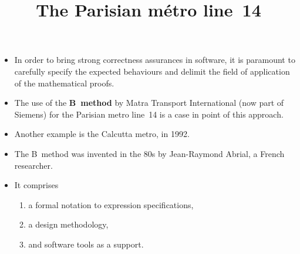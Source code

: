 \documentclass[wide]{slides}
\begin{document}
\begin{slide}
  \title{The Parisian m\'etro line~14}

  \begin{itemize}

    \item In order to bring strong correctness assurances in software,
      it is paramount to carefully specify the expected behaviours and
      delimit the field of application of the mathematical proofs.

    \item The use of the \textbf{B~method} by Matra Transport
      International (now part of Siemens) for the Parisian metro
      line~14 is a case in point of this approach.

    \item Another example is the Calcutta metro, in 1992.

    \item The B~method was invented in the 80s by Jean-Raymond Abrial,
      a French researcher.

    \item It comprises
      \begin{enumerate}

        \item a formal notation to expression specifications,

        \item a design methodology,

        \item and software tools as a support.

      \end{enumerate}

  \end{itemize}

\end{slide}
\end{document}
